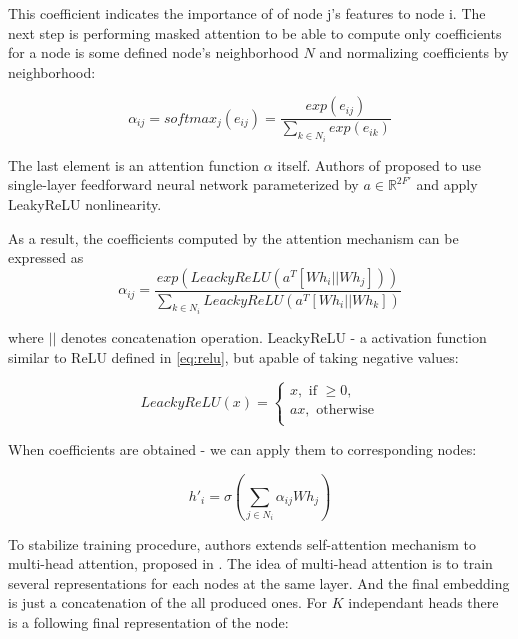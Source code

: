 This coefficient indicates the importance of of node j's features to node i. The next step is performing masked attention to 
be able to compute only coefficients for a node is some defined node's neighborhood $N$ and normalizing coefficients by neighborhood:

\begin{equation}
   \alpha_{ij} = softmax_j(e_{ij}) = \frac{exp(e_{ij})}{\sum_{k \in N_i}exp(e_{ik})}
\end{equation}

The last element is an attention function $\alpha$ itself. Authors of \cite{GAT} proposed to use
single-layer feedforward neural network parameterized by $a \in \mathbb{R}^{2F'}$ and apply LeakyReLU nonlinearity.

As a result, the coefficients computed by the attention mechanism can be expressed as
\begin{equation}
    \alpha_{ij} = \frac{exp(LeackyReLU(a^{T}[Wh_i || Wh_j]))}{\sum_{k \in N_i}LeackyReLU(a^{T}[Wh_i || Wh_k])}
    \label{eq:final_att_coef}
 \end{equation}

where $||$ denotes concatenation operation. LeackyReLU - a activation function similar to ReLU defined in \ref{eq:relu}, but
apable of taking negative values:

\begin{equation}
    LeackyReLU(x) = 
    \begin{cases}
        x, \text{ if } \geq 0, \\
        ax, \text{ otherwise} \\
    \end{cases}
    \label{eq:leacky_relu}
\end{equation}

When coefficients are obtained - we can apply them to corresponding nodes:

\begin{equation}
    h'_i = \sigma \left( \sum_{j \in {N_i}} \alpha_{ij} W h_j \right)
    \label{eq:final_att}
 \end{equation}

To stabilize training procedure, authors extends self-attention mechanism
to multi-head attention, proposed in \cite{AttentionIsAllYouNeed}.
The idea of multi-head attention is to train several representations for each nodes at the same layer. And the final embedding
is just a concatenation of the all produced ones. For $K$ independant heads  there is a following final representation of the node:


